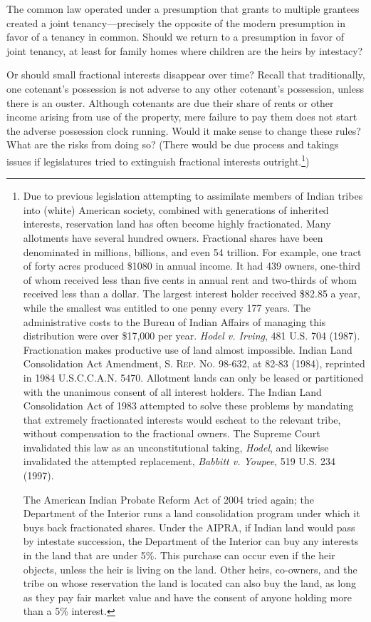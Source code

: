The common law operated under a presumption that grants to multiple grantees
created a joint tenancy---precisely the opposite of the modern presumption in
favor of a tenancy in common. Should we return to a presumption in favor of
joint tenancy, at least for family homes where children are the heirs by
intestacy?

Or should small fractional interests disappear over time? Recall that
traditionally, one cotenant's possession is not adverse to any other cotenant's
possession, unless there is an ouster. Although cotenants are due their share
of rents or other income arising from use of the property, mere failure to pay
them does not start the adverse possession clock running. Would it make sense
to change these rules? What are the risks from doing so? (There would be due
process and takings issues if legislatures tried to extinguish fractional
interests outright.\footnote{Due to previous legislation attempting to
assimilate members of Indian tribes into (white) American society, combined
with generations of inherited interests, reservation land has often become
highly fractionated. Many allotments have several hundred owners. Fractional
shares have been denominated in millions, billions, and even 54 trillion. For
example, one tract of forty acres produced \$1080 in annual income. It had 439
owners, one-third of whom received less than five cents in annual rent and
two-thirds of whom received less than a dollar. The largest interest holder
received \$82.85 a year, while the smallest was entitled to one penny every 177
years. The administrative costs to the Bureau of Indian Affairs of managing
this distribution were over \$17,000 per year. \emph{Hodel v. Irving}, 481 U.S. 704
(1987). Fractionation makes productive use of land almost impossible. Indian
Land Consolidation Act Amendment, \textsc{S. Rep. No.} 98-632, at 82-83 (1984),
reprinted in 1984 U.S.C.C.A.N. 5470. Allotment lands can only be leased or
partitioned with the unanimous consent of all interest holders. The Indian Land
Consolidation Act of 1983 attempted to solve these problems by mandating that
extremely fractionated interests would escheat to the relevant tribe, without
compensation to the fractional owners. The Supreme Court invalidated this law
as an unconstitutional taking, \textit{Hodel}, and likewise invalidated the
attempted replacement, \textit{Babbitt v. Youpee}, 519 U.S. 234 (1997). \par
The American Indian Probate Reform Act of 2004 tried again; the Department of
the Interior runs a land consolidation program under which it buys back
fractionated shares. Under the AIPRA, if Indian land would pass by intestate
succession, the Department of the Interior can buy any interests in the land
that are under 5\%. This purchase can occur even if the heir objects, unless
the heir is living on the land. Other heirs, co-owners, and the tribe on whose
reservation the land is located can also buy the land, as long as they pay fair
market value and have the consent of anyone holding more than a 5\% interest.})


